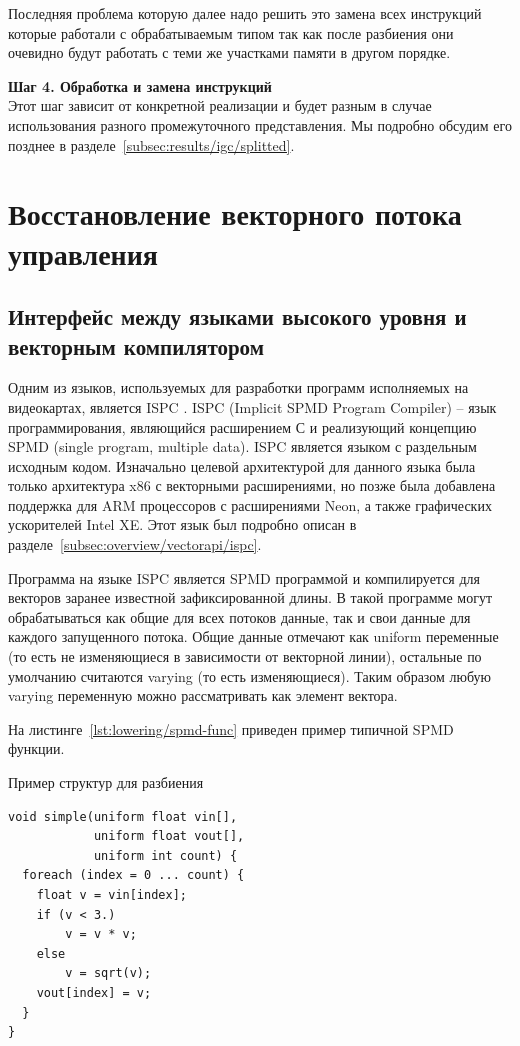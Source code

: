 Последняя проблема которую далее надо решить это замена всех инструкций которые работали с обрабатываемым типом так как после разбиения они очевидно будут работать с теми же участками памяти в другом порядке.

\textbf{Шаг 4. Обработка и замена инструкций}\\

Этот шаг зависит от конкретной реализации и будет разным в случае использования разного промежуточного представления. Мы подробно обсудим его позднее в разделе~\cref{subsec:results/igc/splitted}.

\section{Восстановление векторного потока управления}\label{sec:lowering/simdcf}

\subsection{Интерфейс между языками высокого уровня и векторным компилятором}\label{sec:lowering/simdcf/intface}

Одним из языков, используемых для разработки программ исполняемых на видеокартах, является ISPC \cite{pharr2012ispc}. ISPC (Implicit SPMD Program Compiler) -- язык программирования, являющийся расширением С и реализующий концепцию SPMD (single program, multiple data). ISPC является языком с раздельным исходным кодом. Изначально целевой архитектурой для данного языка была только архитектура x86 с векторными расширениями, но позже была добавлена поддержка для ARM процессоров с расширениями Neon, а также графических ускорителей Intel XE. Этот язык был подробно описан в разделе~\cref{subsec:overview/vectorapi/ispc}.

Программа на языке ISPC является SPMD программой и компилируется для векторов заранее известной зафиксированной длины. В такой программе могут обрабатываться как общие для всех потоков данные, так и свои данные для каждого запущенного потока. Общие данные отмечают как uniform переменные (то есть не изменяющиеся в зависимости от векторной линии), остальные по умолчанию считаются varying (то есть изменяющиеся). Таким образом любую varying переменную можно рассматривать как элемент вектора.

На листинге~\cref{lst:lowering/spmd-func} приведен пример типичной SPMD функции.

\begin{ListingEnv}[!h]
    \captiondelim{ } 
    \caption{Пример структур для разбиения}\label{lst:lowering/spmd-func}
    \begin{lstlisting}[language={[ISO]C++}]
void simple(uniform float vin[],
            uniform float vout[],
            uniform int count) {
  foreach (index = 0 ... count) {
    float v = vin[index];
    if (v < 3.)
        v = v * v;
    else
        v = sqrt(v);
    vout[index] = v;
  }
}
    \end{lstlisting}
\end{ListingEnv}

